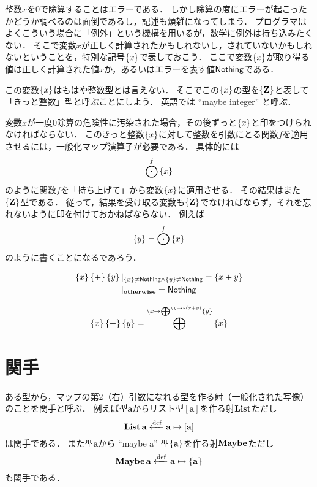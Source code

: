 \documentclass[twocolumn]{jsbook}
\newcommand{\typename}[1]{\mathbf{#1}}
\newcommand{\listtype}[1]{[#1]}
\newcommand{\guard}[1]{\mathop{\mid_{#1}}}
\begin{document}
整数$x$を$0$で除算することはエラーである．
しかし除算の度にエラーが起こったかどうか調べるのは面倒であるし，記述も煩雑になってしまう．
プログラマはよくこういう場合に「例外」という機構を用いるが，数学に例外は持ち込みたくない．
そこで変数$x$が正しく計算されたかもしれないし，されていないかもしれないということを，特別な記号$\left\{x\right\}$で表しておこう．
ここで変数$\left\{x\right\}$が取り得る値は正しく計算された値$x$か，あるいはエラーを表す値$\textsf{Nothing}$である．

この変数$\left\{x\right\}$はもはや整数型とは言えない．
そこでこの$\left\{x\right\}$の型を$\maybe{\integertype}$と表して「きっと整数」型と呼ぶことにしよう．
英語では ``maybe integer'' と呼ぶ．

変数$x$が一度$0$除算の危険性に汚染された場合，その後ずっと$\left\{x\right\}$と印をつけられなければならない．
このきっと整数$\left\{x\right\}$に対して整数を引数にとる関数$f$を適用させるには，一般化マップ演算子が必要である．
具体的には$$\bigodot^f\left\{x\right\}$$のように関数$f$を「持ち上げて」から変数$\left\{x\right\}$に適用させる．
その結果はまた$\maybe{\integertype}$型である．
従って，結果を受け取る変数も$\maybe{\integertype}$でなければならず，それを忘れないように印を付けておかねばならない．
例えば$$\left\{y\right\}=\bigodot^f\left\{x\right\}$$のように書くことになるであろう．

\begin{align*}
\maybe{x}\maybe{+}\maybe{y}&\guard{\maybe{x}\neq\nothing\wedge\maybe{y}\neq\nothing}=\maybe{x+y}\\
&\guard{\otherwise}=\nothing
\end{align*}

$$\left\{x\right\}\left\{+\right\}\left\{y\right\}=\bigoplus^{\backslash x\rightarrow\bigoplus^{\backslash y\rightarrow\star(x+y)}\left\{y\right\}}\left\{x\right\}$$


\section{関手}

ある型から，マップの第2（右）引数になれる型を作る射（一般化された写像）のことを関手と呼ぶ．
例えば型$\typename{a}$からリスト型$[\typename{a}]$を作る射$\mathop{\mathop{\textbf{List}}}$ただし$$\listfunctor\typename{a}\defeq\typename{a}\mapsto\listtype{\typename{a}}$$は関手である．
また型$\typename{a}$から ``maybe a'' 型$\maybe{\typename{a}}$を作る射$\mathop{\mathop{\textbf{Maybe}}}$ただし$$\maybefunctor\typename{a}\defeq\typename{a}\mapsto\maybe{\typename{a}}$$も関手である．
\end{document}
